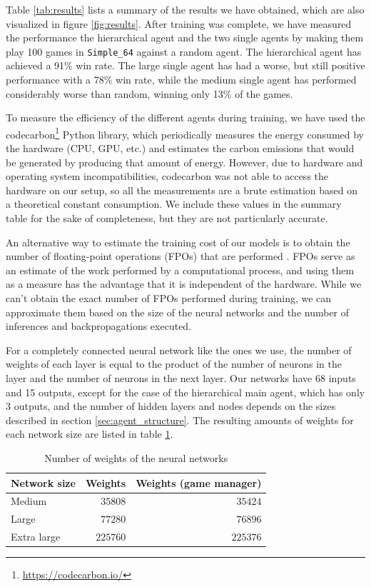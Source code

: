 Table \ref{tab:results} lists a summary of the results we have obtained, which are also visualized in figure \ref{fig:results}. After training was complete, we have measured the performance the hierarchical agent and the two single agents by making them play 100 games in \texttt{Simple\_64} against a random agent. The hierarchical agent has achieved a 91\% win rate. The large single agent has had a worse, but still positive performance with a 78\% win rate, while the medium single agent has performed considerably worse than random, winning only 13\% of the games.

To measure the efficiency of the different agents during training, we have used the codecarbon\footnote{\url{https://codecarbon.io/}} Python library, which periodically measures the energy consumed by the hardware (CPU, GPU, etc.) and estimates the carbon emissions that would be generated by producing that amount of energy. However, due to hardware and operating system incompatibilities, codecarbon was not able to access the hardware on our setup, so all the measurements are a brute estimation based on a theoretical constant consumption. We include these values in the summary table for the sake of completeness, but they are not particularly accurate.

An alternative way to estimate the training cost of our models is to obtain the number of floating-point operations (FPOs) that are performed \cite{Schwartz:2019}. FPOs serve as an estimate of the work performed by a computational process, and using them as a measure has the advantage that it is independent of the hardware. While we can't obtain the exact number of FPOs performed during training, we can approximate them based on the size of the neural networks and the number of inferences and backpropagations executed.

For a completely connected neural network like the ones we use, the number of weights of each layer is equal to the product of the number of neurons in the layer and the number of neurons in the next layer. Our networks have 68 inputs and 15 outputs, except for the case of the hierarchical main agent, which has only 3 outputs, and the number of hidden layers and nodes depends on the sizes described in section \ref{sec:agent_structure}. The resulting amounts of weights for each network size are listed in table \ref{tab:weights}.

\begin{table}[h]
    \centering
    \begin{tabular}{ l|r r }
        Network size & Weights & Weights (game manager) \\
        \hline
        Medium & $35808$ & $35424$ \\
        Large & $77280$ & $76896$ \\
        Extra large & $225760$ & $225376$ \\
    \end{tabular}
    \caption{Number of weights of the neural networks}
    \label{tab:weights}
\end{table}

